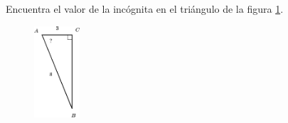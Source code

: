 Encuentra el valor de la incógnita en el triángulo de la figura \ref{fig:angle_functrig_17}.
\begin{figure}[H]
    \begin{center}
        \includegraphics[width=0.15\textwidth]{../images/angle_functrig_17.png}
    \end{center}
    \caption{}
    \label{fig:angle_functrig_17}
\end{figure}